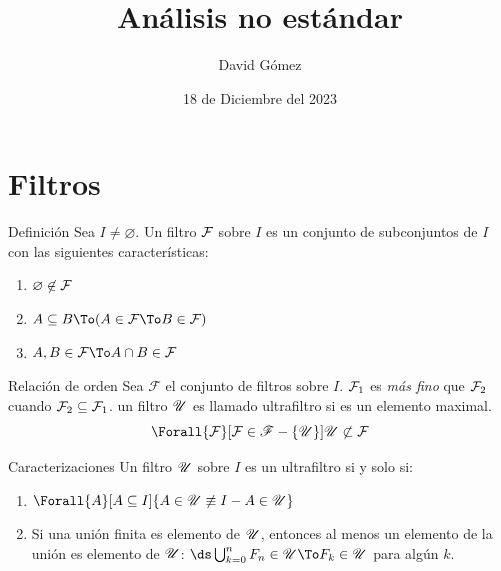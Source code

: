 \documentclass{beamer}
\title{Análisis no estándar}
\author[{David G.}]{{David Gómez}}
\institute[ECI]{
    Escuela Colombiana de Ingeniería\\
    Matemáticas
    }
\date[18/12/2023]{18 de Diciembre del 2023}
\begin{document}
\begin{frame}
  \titlepage
\end{frame}

\section{Filtros}
\begin{frame}{Definición}
    Sea $I\not=\varnothing$. Un filtro $\mathcal{F}$ sobre $I$ es un conjunto de
    subconjuntos de $I$ con las siguientes características:
    \begin{enumerate}
      \item $\varnothing\not\in \mathcal{F}$
      \item $A\subseteq B \To (A\in\F \To B\in\F)$
      \item $A,B\in\F \To A\cap B\in\F$
    \end{enumerate}
\end{frame}

\begin{frame}{Relación de orden}
  Sea $\mathscr{F}$ el conjunto de filtros sobre $I$.
  $\mathcal{F}_1$ es \emph{más fino} que $\mathcal{F}_2$ cuando
  $\mathcal{F}_2 \subseteq \mathcal{F}_1$.
  un filtro $\mathscr{U}$ es llamado ultrafiltro si es un elemento maximal.
  \[\Forall{\F}[\F\in\mathscr{F}-\{\U\}]{\U \not\subset \F}\]
\end{frame}

\begin{frame}{Caracterizaciones}
  Un filtro $\mathscr{U}$ sobre $I$ es un ultrafiltro si y solo si:
  \begin{enumerate}
    \item $\Forall{A}[A\subseteq I]{A\in\U\not\equiv I-A\in\U}$
    \item Si una unión finita es elemento de $\mathscr{U}$, entonces al menos un
          elemento de la unión es elemento de $\mathscr{U}$:
          $\ds\bigcup_{k=0}^n F_n \in \U \To F_k \in \U$ para algún $k$.
  \end{enumerate}
\end{frame}
\end{document}

